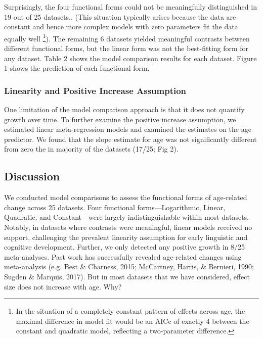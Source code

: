 \documentclass[
  man]{apa6}
\begin{document}
Surprisingly, the four functional forms could not be meaningfully distinguished in 19 out of 25 datasets.. (This situation typically arises because the data are constant and hence more complex models with zero parameters fit the data equally well \footnote{In the situation of a completely constant pattern of effects across age, the maximal difference in model fit would be an AICc of exactly 4 between the constant and quadratic model, reflecting a two-parameter difference.}). The remaining 6 datasets yielded meaningful contrasts between different functional forms, but the linear form was not the best-fitting form for any dataset. Table 2 shows the model comparison results for each dataset. Figure 1 shows the prediction of each functional form.

\hypertarget{linearity-and-positive-increase-assumption}{%
\subsubsection{Linearity and Positive Increase Assumption}\label{linearity-and-positive-increase-assumption}}

One limitation of the model comparison approach is that it does not quantify growth over time. To further examine the positive increase assumption, we estimated linear meta-regression models and examined the estimates on the age predictor. We found that the slope estimate for age was not significantly different from zero the in majority of the datasets (17/25; Fig 2).

\hypertarget{discussion}{%
\subsection{Discussion}\label{discussion}}

We conducted model comparisons to assess the functional forms of age-related change across 25 datasets. Four functional forms---Logarithmic, Linear, Quadratic, and Constant---were largely indistinguishable within most datasets. Notably, in datasets where contrasts were meaningful, linear models received no support, challenging the prevalent linearity assumption for early linguistic and cognitive development. Further, we only detected any positive growth in 8/25 meta-analyses. Past work has successfully revealed age-related changes using meta-analysis (e.g. Best \& Charness, 2015; McCartney, Harris, \& Bernieri, 1990; Sugden \& Marquis, 2017). But in most datasets that we have considered, effect size does not increase with age. Why?
\end{document}
